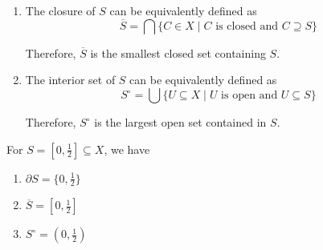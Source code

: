 \begin{proposition}
\begin{enumerate}
\item
The closure of $S$ can be equivalently defined as
\[
\overline{S}=\bigcap\{C\in X\mid\text{$C$ is closed and $C\supseteq S$}\}
\]

Therefore, $\overline{S}$ is the smallest closed set containing $S$.
\item
The interior set of $S$ can be equivalently defined as
\[
S^\circ=\bigcup\{U\subseteq X\mid\text{$U$ is open and $U\subseteq S$}\}
\]

Therefore, $S^\circ$ is the largest open set contained in $S$.
\end{enumerate}
\end{proposition}
\begin{example}
For $S=[0,\frac{1}{2}]\subseteq X$, we have
\begin{enumerate}
\item
$\partial S=\{0,\frac{1}{2}\}$
\item
$\overline{S}=[0,\frac{1}{2}]$
\item
$S^\circ=(0,\frac{1}{2})$
\end{enumerate}
\end{example}
